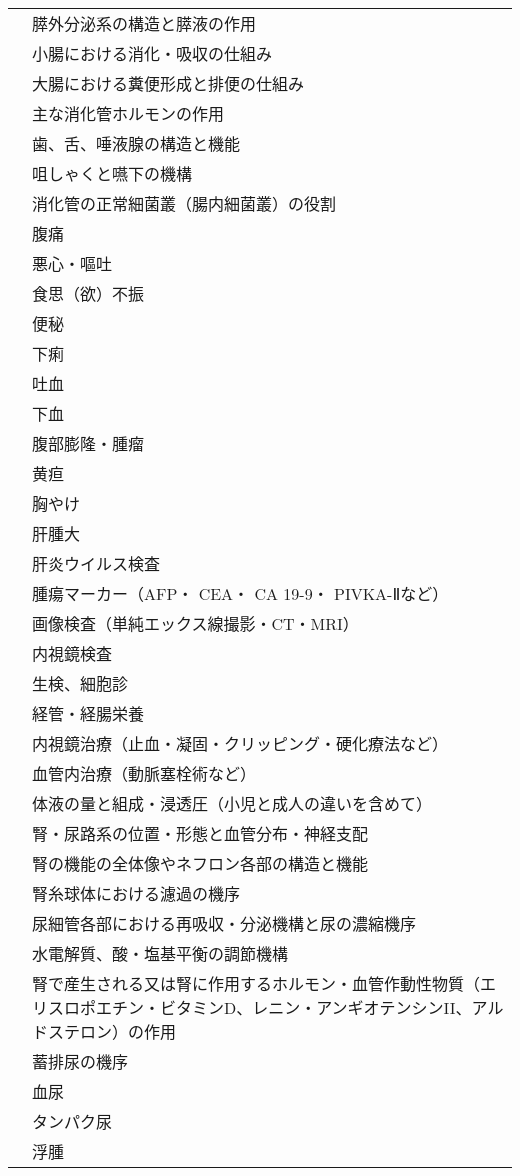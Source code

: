 \begin{xltabular}{\linewidth}{XX}
 & 膵外分泌系の構造と膵液の作用 \\
 & 小腸における消化・吸収の仕組み \\
 & 大腸における糞便形成と排便の仕組み \\
 & 主な消化管ホルモンの作用 \\
 & 歯、舌、唾液腺の構造と機能 \\
 & 咀しゃくと嚥下の機構 \\
 & 消化管の正常細菌叢（腸内細菌叢）の役割 \\
 & 腹痛 \\
 & 悪心・嘔吐 \\
 & 食思（欲）不振 \\
 & 便秘 \\
 & 下痢 \\
 & 吐血 \\
 & 下血 \\
 & 腹部膨隆・腫瘤 \\
 & 黄疸 \\
 & 胸やけ \\
 & 肝腫大 \\
 & 肝炎ウイルス検査 \\
 & 腫瘍マーカー（AFP・ CEA・ CA 19-9・ PIVKA-Ⅱなど） \\
 & 画像検査（単純エックス線撮影・CT・MRI） \\
 & 内視鏡検査 \\
 & 生検、細胞診 \\
 & 経管・経腸栄養 \\
 & 内視鏡治療（止血・凝固・クリッピング・硬化療法など） \\
 & 血管内治療（動脈塞栓術など） \\
 & 体液の量と組成・浸透圧（小児と成人の違いを含めて） \\
 & 腎・尿路系の位置・形態と血管分布・神経支配 \\
 & 腎の機能の全体像やネフロン各部の構造と機能 \\
 & 腎糸球体における濾過の機序 \\
 & 尿細管各部における再吸収・分泌機構と尿の濃縮機序 \\
 & 水電解質、酸・塩基平衡の調節機構 \\
 & 腎で産生される又は腎に作用するホルモン・血管作動性物質（エリスロポエチン・ビタミンD、レニン・アンギオテンシンII、アルドステロン）の作用 \\
 & 蓄排尿の機序 \\
 & 血尿 \\
 & タンパク尿 \\
 & 浮腫 \\

\end{xltabular}
